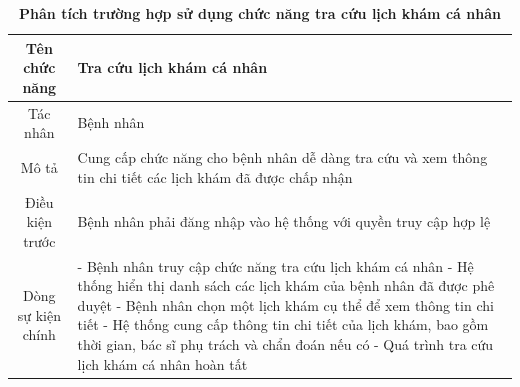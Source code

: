 \begin{table}[H]
	\caption{\bfseries \fontsize{12pt}{0pt}\selectfont Phân tích trường hợp sử dụng chức năng tra cứu lịch khám cá nhân}
	\centering
	\begin{tabularx}{0.9\textwidth}{|c|X|}
		\hline
		\textbf{Tên chức năng} & \textbf{Tra cứu lịch khám cá nhân}                                                                         \\
		\hline
		Tác nhân               & Bệnh nhân                                                                                                  \\
		\hline
		Mô tả                  & Cung cấp chức năng cho bệnh nhân dễ dàng tra cứu và xem thông tin chi tiết các lịch khám đã được chấp nhận \\
		\hline
		Điều kiện trước        & Bệnh nhân phải đăng nhập vào hệ thống với quyền truy cập hợp lệ                                            \\
		\hline
		Dòng sự kiện chính     &
		- Bệnh nhân truy cập chức năng tra cứu lịch khám cá nhân \newline
		- Hệ thống hiển thị danh sách các lịch khám của bệnh nhân đã được phê duyệt \newline
		- Bệnh nhân chọn một lịch khám cụ thể để xem thông tin chi tiết \newline
		- Hệ thống cung cấp thông tin chi tiết của lịch khám, bao gồm thời gian, bác sĩ phụ trách và chẩn đoán nếu có \newline
		- Quá trình tra cứu lịch khám cá nhân hoàn tất                                                                                      \\
		\hline
	\end{tabularx}
\end{table}

